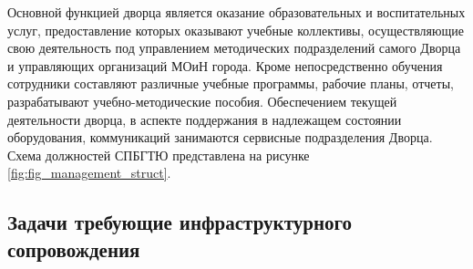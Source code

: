 \documentclass[utf8,usehyperref,12pt]{G7-32}
\begin{document}
Основной функцией дворца является оказание образовательных и воспитательных услуг, предоставление которых оказывают учебные коллективы, осуществляющие свою деятельность под управлением методических подразделений самого Дворца
и управляющих организаций МОиН города. Кроме непосредственно обучения сотрудники  составляют различные учебные программы, рабочие планы, отчеты, разрабатывают учебно-методические пособия.
Обеспечением текущей деятельности дворца, в аспекте поддержания в надлежащем состоянии оборудования, коммуникаций занимаются сервисные подразделения Дворца. Схема должностей СПБГТЮ представлена на рисунке \ref{fig:fig_management_struct}.

\subsection{Задачи требующие инфраструктурного сопровождения}

% 
% 
% 
% 
\end{document}
